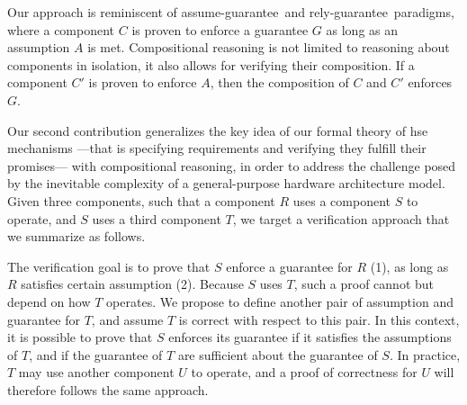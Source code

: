Our approach is reminiscent of assume-guarantee\,\cite{pnueli1985ag} and
rely-guarantee\,\cite{jones1983tentative} paradigms, where a component \( C \)
is proven to enforce a guarantee \( G \) as long as an assumption \( A \) is
met. 
%
Compositional reasoning  is not
limited to reasoning about components in isolation, it also allows for verifying
their composition.
%
If a component \( C' \) is proven to enforce \( A \), then the composition of
\( C \) and \( C' \) enforces \( G \).

Our second contribution generalizes the key idea of our formal theory of
\ac{hse} mechanisms ---that is specifying requirements and verifying they
fulfill their promises--- with compositional reasoning, in order to address the
challenge posed by the inevitable complexity of a general-purpose hardware
architecture model.
%
Given three components, such that a component \( R \) uses a
component \( S \) to operate, and \( S \) uses a third component \( T \), we
target a verification approach that we summarize as follows.

\begin{center}
\end{center}

The verification goal is to prove that \( S \) enforce a guarantee for \( R \)
(1), as long as \( R \) satisfies certain assumption (2).
%
Because \( S \) uses \( T \), such a proof cannot but depend  on how \( T \) operates.
%
We propose to define another pair of assumption and guarantee for \( T \), and
assume \( T \) is correct with respect to this pair.
%
In this context, it is possible to prove that \( S \) enforces its guarantee if
it satisfies the assumptions of \( T \), and if the guarantee of \( T \) are
sufficient about the guarantee of \( S \).
%
In practice, \( T \) may use another component \( U \) to operate, and a proof
of correctness for \( U \) will therefore follows the same approach.

